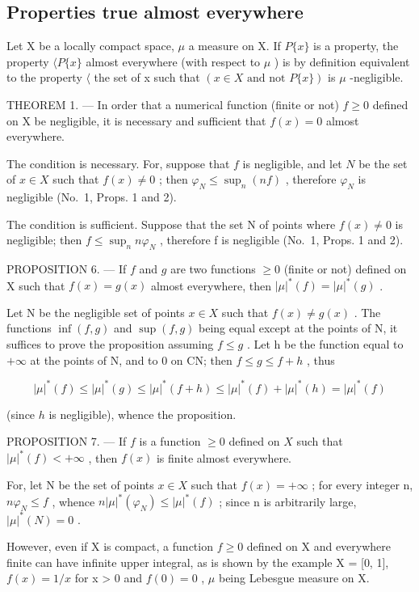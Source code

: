 \subsection{Properties true almost everywhere}

Let X be a locally compact space, \(\mu\) a measure on X. If \(P\{x\}\) is a property, the property \(\langle P\{x\}\) almost everywhere (with respect to \(\mu\) ) is by definition equivalent to the property \(\langle\) the set of x such that \((x \in X \text{ and not } P\{x\})\) is \(\mu\) -negligible.

THEOREM 1. --- In order that a numerical function (finite or not) \(f \geqslant 0\) defined on X be negligible, it is necessary and sufficient that \(f(x) = 0\) almost everywhere.

The condition is necessary. For, suppose that \(f\) is negligible, and let \(N\) be the set of \(x \in X\) such that \(f(x) \neq 0\) ; then \(\varphi_N \leqslant \sup_n (nf)\) , therefore \(\varphi_N\) is negligible (No.~1, Props. 1 and 2).

The condition is sufficient. Suppose that the set N of points where \(f(x) \neq 0\) is negligible; then \(f \leqslant \sup_{n} n\varphi_{N}\) , therefore f is negligible (No.~1, Props. 1 and 2).

PROPOSITION 6. --- If \(f\) and \(g\) are two functions \(\geqslant 0\) (finite or not) defined on X such that \(f(x) = g(x)\) almost everywhere, then \(|\mu|^*(f) = |\mu|^*(g)\) .

Let N be the negligible set of points \(x \in X\) such that \(f(x) \neq g(x)\) . The functions \(\inf(f, g)\) and \(\sup(f, g)\) being equal except at the points of N, it suffices to prove the proposition assuming \(f \leqslant g\) . Let h be the function equal to \(+\infty\) at the points of N, and to 0 on CN; then \(f \leqslant g \leqslant f + h\) , thus

\[
| \mu | ^ {*} (f) \leqslant | \mu | ^ {*} (g) \leqslant | \mu | ^ {*} (f + h) \leqslant | \mu | ^ {*} (f) + | \mu | ^ {*} (h) = | \mu | ^ {*} (f)
\]

(since \(h\) is negligible), whence the proposition.

PROPOSITION 7. --- If \(f\) is a function \(\geqslant 0\) defined on \(X\) such that \(|\mu|^*(f) < +\infty\) , then \(f(x)\) is finite almost everywhere.

For, let N be the set of points \(x \in X\) such that \(f(x) = +\infty\) ; for every integer n, \(n\varphi_{N} \leqslant f\) , whence \(n|\mu|^{*}(\varphi_{N}) \leqslant |\mu|^{*}(f)\) ; since n is arbitrarily large, \(|\mu|^{*}(N) = 0\) .

However, even if X is compact, a function \(f \geqslant 0\) defined on X and everywhere finite can have infinite upper integral, as is shown by the example X = {[}0, 1{]}, \(f(x) = 1/x\) for x \textgreater{} 0 and \(f(0) = 0\) , \(\mu\) being Lebesgue measure on X.

